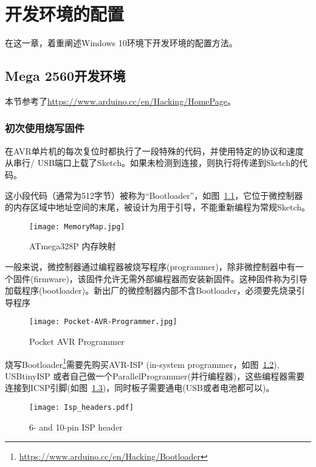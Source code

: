 \chapter{开发环境的配置}
\label{cha:Environment}

在这一章，着重阐述Windows 10环境下开发环境的配置方法。

\section{Mega 2560开发环境}

本节参考了\url{https://www.arduino.cc/en/Hacking/HomePage}。

\subsection{初次使用烧写固件}

在AVR单片机的每次复位时都执行了一段特殊的代码，并使用特定的协议和速度从串行/ USB端口上载了Sketch。如果未检测到连接，则执行将传递到Sketch的代码。

这小段代码（通常为512字节）被称为“Bootloader”，如图~\ref{fig:MemoryMap}，它位于微控制器的内存区域中地址空间的末尾，被设计为用于引导，不能重新编程为常规Sketch。

\begin{figure}[htbp]
    \centering
    \texttt{[image: MemoryMap.jpg]}
    \caption{ATmega328P 内存映射}
    \label{fig:MemoryMap}
\end{figure}

一般来说，微控制器通过编程器被烧写程序(programmer)，除非微控制器中有一个固件(firmware)，该固件允许无需外部编程器而安装新固件。这种固件称为引导加载程序(bootloader)。新出厂的微控制器内部不含Bootloader，必须要先烧录引导程序

\begin{figure}[htbp]
    \centering
    \texttt{[image: Pocket-AVR-Programmer.jpg]}
    \caption{Pocket AVR Programmer}
    \label{fig:Pocket-AVR-Programmer}
\end{figure}

烧写Bootloader\footnote{\url{https://www.arduino.cc/en/Hacking/Bootloader}}需要先购买AVR-ISP (in-system programmer，如图~\ref{fig:Pocket-AVR-Programmer}), USBtinyISP 或者自己做一个ParallelProgrammer(并行编程器)，这些编程器需要连接到ICSP引脚(如图~\ref{fig:Isp_headers})，同时板子需要通电(USB或者电池都可以)。

\begin{figure}[htbp]
    \centering
    \texttt{[image: Isp\_headers.pdf]}
    \caption{6- and 10-pin ISP header}
    \label{fig:Isp_headers}
\end{figure}

